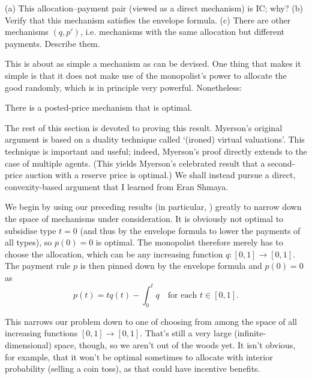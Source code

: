 \begin{exercise}
	\label{exercise:posted_price2}
	(a) This allocation--payment pair (viewed as a direct mechanism) is IC; why?
	(b) Verify that this mechanism satisfies the envelope formula.
	(c) There are other mechanisms $(q,p')$, i.e. mechanisms with the same allocation but different payments. Describe them.
\end{exercise}

This is about as simple a mechanism as can be devised.
One thing that makes it simple is that it does not make use of the monopolist's power to allocate the good randomly, which is in principle very powerful.
Nonetheless:

\begin{theorem}
	\label{theorem:Myerson}
	There is a posted-price mechanism that is optimal.
\end{theorem}

The rest of this section is devoted to proving this result.
Myerson's original argument is based on a duality technique called `(ironed) virtual valuations'. This technique is important and useful; indeed, Myerson's proof directly extends to the case of multiple agents. (This yields Myerson's celebrated result that a second-price auction with a reserve price is optimal.)
We shall instead pursue a direct, convexity-based argument that I learned from Eran Shmaya.

We begin by using our preceding results (in particular, ) greatly to narrow down the space of mechanisms under consideration.
It is obviously not optimal to subsidise type $t=0$ (and thus by the envelope formula to lower the payments of all types), so $p(0)=0$ is optimal.
The monopolist therefore merely has to choose the allocation, which can be any increasing function $q : [0,1] \to [0,1]$.
The payment rule $p$ is then pinned down by the envelope formula and $p(0)=0$ as
%
\begin{equation*}
	p(t)
	= t q(t) - \int_0^t q 
	\quad \text{for each $t \in [0,1]$.}
\end{equation*}

This narrows our problem down to one of choosing from among the space of all increasing functions $[0,1] \to [0,1]$.
That's still a very large (infinite-dimensional) space, though, so we aren't out of the woods yet.
It isn't obvious, for example, that it won't be optimal sometimes to allocate with interior probability (selling a coin toss), as that could have incentive benefits.

